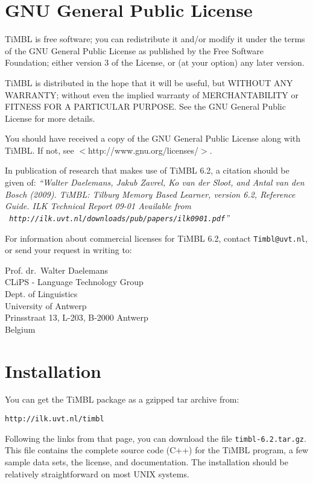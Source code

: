 \documentclass{report}
\begin{document}
\chapter{GNU General Public License}
\label{license}

TiMBL is free software; you can redistribute it and/or modify it under the terms of the GNU General Public License as published by the Free Software Foundation; either version 3 of the License, or (at your option) any later version.

TiMBL is distributed in the hope that it will be useful, but WITHOUT ANY WARRANTY; without even the implied warranty of MERCHANTABILITY or FITNESS FOR A PARTICULAR PURPOSE.  See the GNU General Public License for more details.

You should have received a copy of the GNU General Public License along with TiMBL.  If not, see $<$http://www.gnu.org/licenses/$>$.

In publication of research that makes use of TiMBL 6.2, a citation should be given of: {\em ``Walter Daelemans, Jakub Zavrel, Ko van der
  Sloot, and Antal van den Bosch (2009). TiMBL: Tilburg Memory Based
  Learner, version 6.2, Reference Guide. ILK Technical Report 09-01
  Available from \\ {\tt
    http://ilk.uvt.nl/downloads/pub/papers/ilk0901.pdf}''}

For information about commercial licenses for TiMBL 6.2,
contact {\tt Timbl@uvt.nl}, or send your request in writing to:

Prof. dr.~Walter Daelemans\\
CLiPS - Language Technology Group\\
Dept. of Linguistics \\
University of Antwerp\\
Prinsstraat 13, L-203, B-2000 Antwerp \\
Belgium

\pagestyle{headings}

\chapter{Installation}
\vspace{-1cm}
You can get the TiMBL package as a gzipped tar archive from:

{\tt http://ilk.uvt.nl/timbl}

Following the links from that page, you can download the file {\tt timbl-6.2.tar.gz}. This file contains the complete source code (C++) for the TiMBL program, a few sample data sets, the license, and documentation. The installation should be relatively straightforward on most UNIX systems.
\end{document}

